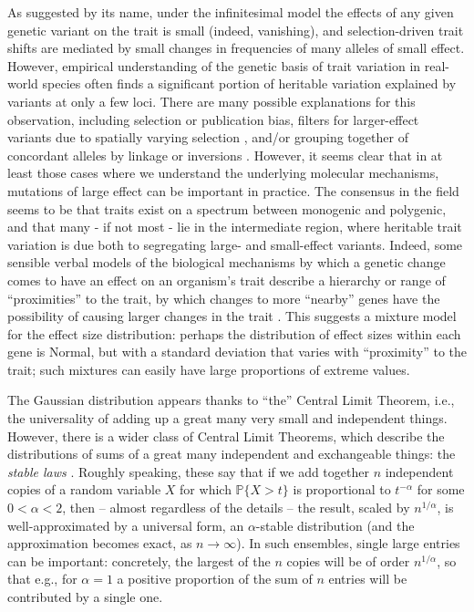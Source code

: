 \documentclass{article}
\renewcommand{\P}{\mathbb{P}}
\newcommand{\1}{\mathbbm{1}}
\theoremstyle{remark}
\theoremstyle{definition}
\begin{document}
As suggested by its name,
under the infinitesimal model the effects of any given genetic variant on the trait
is small (indeed, vanishing),
and selection-driven trait shifts are mediated by small changes in frequencies of many alleles of small effect.
However, empirical understanding of the genetic basis of trait variation in real-world species
often finds a significant portion of heritable variation explained by variants at only a few loci.
There are many possible explanations for this observation,
including selection or publication bias,
filters for larger-effect variants due to spatially varying selection
\citep{barton1987establishment,yeaman2011establishment,yeaman2011genetic},
and/or grouping together of concordant alleles by linkage or inversions
\citep{kirkpatrick2006chromosome}.
However,
it seems clear that in at least those cases where we understand the underlying molecular mechanisms,
mutations of large effect can be important in practice.
The consensus in the field seems to be that traits exist on a spectrum between monogenic and polygenic,
and that many - if not most - lie in the intermediate region,
where heritable trait variation is due both to segregating large- and small-effect variants.
Indeed, some sensible verbal models of the biological mechanisms by which a genetic change
comes to have an effect on an organism's trait
describe a hierarchy or range of ``proximities'' to the trait,
by which changes to more ``nearby'' genes have the possibility of causing larger changes in the trait
\citep{kopp2012transcriptional,boyle2017expanded}.
This suggests a mixture model for the effect size distribution:
perhaps the distribution of effect sizes within each gene is Normal, 
but with a standard deviation that varies with ``proximity'' to the trait;
such mixtures can easily have large proportions of extreme values.

The Gaussian distribution appears thanks to ``the'' Central Limit Theorem,
i.e., the universality of adding up a great many very small and independent things.
However, there is a wider class of Central Limit Theorems,
which describe the distributions of sums of a great many independent and exchangeable things:
the \emph{stable laws} \citep{gnedenko1968limit}.
Roughly speaking, these say that if we add together $n$ independent copies of a random variable $X$
for which $\P\{ X > t \}$ is proportional to $t^{-\alpha}$ for some $0 < \alpha < 2$,
then -- almost regardless of the details -- the result, scaled by $n^{1/\alpha}$,
is well-approximated by a universal form, an $\alpha$-stable distribution
(and the approximation becomes exact, as $n \to \infty$).
In such ensembles, single large entries can be important:
concretely, the largest of the $n$ copies will be of order $n^{1/\alpha}$,
so that e.g., for $\alpha=1$ a positive proportion of the sum of $n$ entries will be contributed by a single one.
\end{document}
